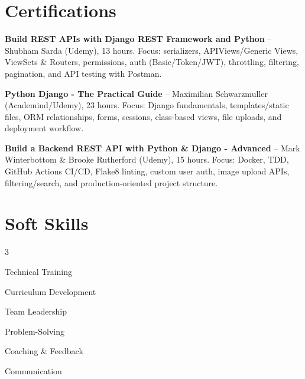 \documentclass[a4paper,11pt]{article}
\begin{document}
\section{Certifications}
\vspace{2pt}
\begin{itemize}[leftmargin=0.15in]
  \small{
    \item \textbf{Build REST APIs with Django REST Framework and Python} -- Shubham Sarda (Udemy), 13 hours. Focus: serializers, APIViews/Generic Views, ViewSets \& Routers, permissions, auth (Basic/Token/JWT), throttling, filtering, pagination, and API testing with Postman.
    \item \textbf{Python Django - The Practical Guide} -- Maximilian Schwarzmuller (Academind/Udemy), 23 hours. Focus: Django fundamentals, templates/static files, ORM relationships, forms, sessions, class-based views, file uploads, and deployment workflow.
    \item \textbf{Build a Backend REST API with Python \& Django - Advanced} -- Mark Winterbottom \& Brooke Rutherford (Udemy), 15 hours. Focus: Docker, TDD, GitHub Actions CI/CD, Flake8 linting, custom user auth, image upload APIs, filtering/search, and production-oriented project structure.
  }
\end{itemize}

\section{Soft Skills}
\begin{multicols}{3}
\begin{itemize}[leftmargin=0.15in]
  \small{
    \item Technical Training
    \item Curriculum Development
    \item Team Leadership
    \item Problem-Solving
    \item Coaching \& Feedback
    \item Communication
  }
\end{itemize}
\end{multicols}
\end{document}
